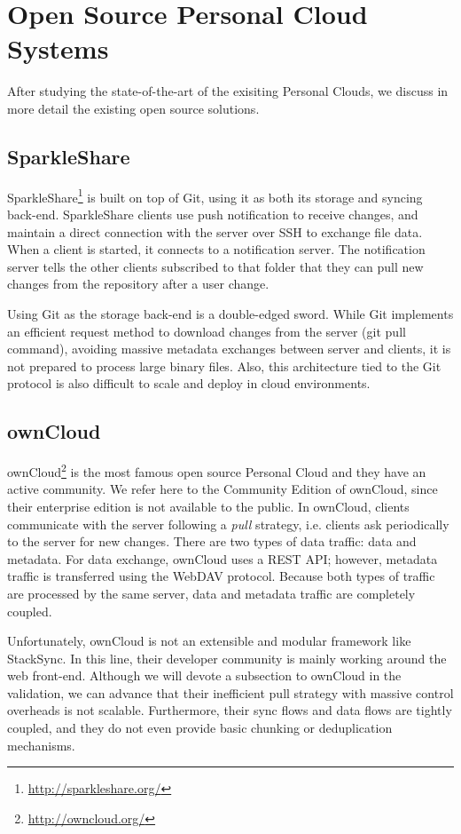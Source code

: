 \section{Open Source Personal Cloud Systems}

After studying the state-of-the-art of the exisiting Personal Clouds, we discuss in more detail
the existing open source solutions.

\subsection{SparkleShare}

SparkleShare\footnote{\url{http://sparkleshare.org/}} is built on top of Git, using it 
as both its storage and syncing back-end. SparkleShare clients use push notification
to receive changes, and maintain a direct connection with the server over SSH to exchange file data.
When a client is started, it connects to a notification server. The notification server tells the other
clients subscribed to that folder that they can pull new changes from the repository after a user
change. 

Using Git as the storage back-end is a double-edged sword. While Git implements an efficient request
method to download changes from the server (git pull command), avoiding massive metadata exchanges
between server and clients, it is not prepared to process large binary files. Also, this architecture
tied to the Git protocol is also difficult to scale and deploy in cloud environments.

\subsection{ownCloud}
ownCloud\footnote{\url{http://owncloud.org/}} is the most famous open source  Personal Cloud 
and they have an active community. We refer here to the Community Edition of ownCloud, since their enterprise edition is not available to the public. In ownCloud, clients communicate with the server following a \textit{pull} strategy, i.e. clients ask periodically to the server for new changes. There are two types of data traffic: data and metadata. For data exchange, ownCloud uses a REST API; however, metadata traffic is transferred using the WebDAV protocol. 
Because both types of traffic are processed by the same server, data and metadata traffic are completely coupled.

Unfortunately, ownCloud is not an extensible and modular framework like StackSync. In this line, their developer community is mainly working around the web front-end. Although we will devote a subsection to ownCloud in the validation, we can advance that their inefficient pull strategy with massive control overheads is not scalable. Furthermore, their sync flows and data flows are tightly coupled, and they do not even provide basic chunking or deduplication mechanisms. 

